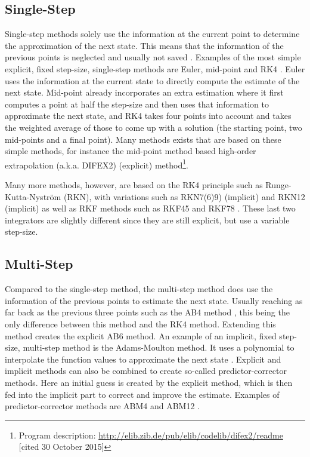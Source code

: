 


\subsection{Single-Step}
\label{subsec:singleStep}
Single-step methods solely use the information at the current point to determine the approximation of the next state. This means that the information of the previous points is neglected and usually not saved \citep{noomen2013int}. Examples of the most simple explicit, fixed step-size, single-step methods are Euler, mid-point and \ac{RK4} \citep{hofsteenge2013}. Euler uses the information at the current state to directly compute the estimate of the next state. Mid-point already incorporates an extra estimation where it first computes a point at half the step-size and then uses that information to approximate the next state, and \ac{RK4} takes four points into account and takes the weighted average of those to come up with a solution (the starting point, two mid-points and a final point). Many methods exists that are based on these simple methods, for instance the mid-point method based high-order extrapolation (a.k.a. DIFEX2) (explicit) method\footnote{Program description: \url{http://elib.zib.de/pub/elib/codelib/difex2/readme} [cited 30 October 2015]}.

Many more methods, however, are based on the \ac{RK4} principle such as Runge-Kutta-Nystr\"{o}m (RKN), with variations such as RKN7(6)9) (implicit) \citep{montenbruck1992,dormand1987} and \ac{RKN12} (implicit) \citep{montenbruck1992}  as well as \ac{RKF} methods such as \acf{RKF45} and \acf{RKF78} \citep{fehlberg1969,fehlberg1968}. These last two integrators are slightly different since they are still explicit, but use a variable step-size.


\subsection{Multi-Step}
\label{subsec:multiStep}
Compared to the single-step method, the multi-step method does use the information of the previous points to estimate the next state. Usually reaching as far back as the previous three points such as the \ac{AB4} method \citep{noomen2013int}, this being the only difference between this method and the \ac{RK4} method. Extending this method creates the explicit \ac{AB6} method. An example of an implicit, fixed step-size, multi-step method is the Adams-Moulton method. It uses a polynomial to interpolate the function values to approximate the next state \citep{noomen2013int}. Explicit and implicit methods can also be combined to create so-called predictor-corrector methods. Here an initial guess is created by the explicit method, which is then fed into the implicit part to correct and improve the estimate. Examples of predictor-corrector methods are \ac{ABM4} and \ac{ABM12} \citep{montenbruck1992,noomen2013int}. 

